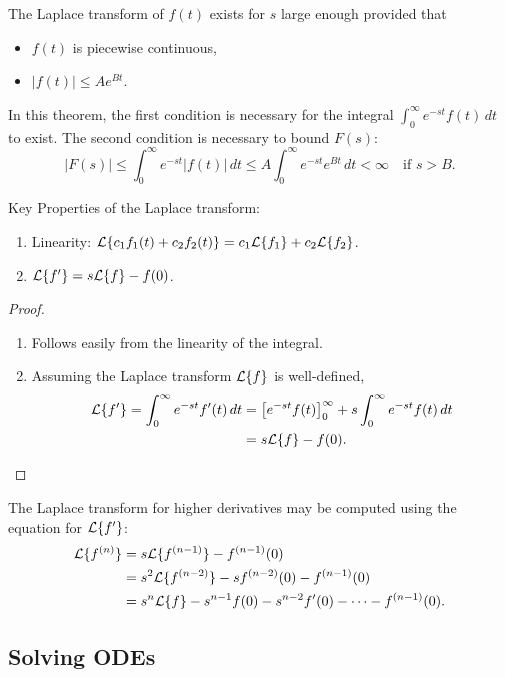 \begin{theorem}
	The Laplace transform of $f(t)$ exists for $s$ large enough provided that
	\begin{itemize}
		\item $f(t)$ is piecewise continuous,
		\item $|f(t)| \leq Ae^{Bt}$.
	\end{itemize}
\end{theorem}

In this theorem, the first condition is necessary for the integral $\int_0^{\infty} e^{-st}f(t)\,dt$ to exist. The second condition is necessary to bound $F(s)$:
\[
|F(s)| \leq \int_0^{\infty} e^{-st}|f(t)|\,dt \leq A\int_0^{\infty} e^{-st}e^{Bt}\,dt < \infty \quad\text{if } s>B.
\]

Key Properties of the Laplace transform:
\begin{enumerate}
	\item Linearity: $\mathcal{L}\{c_1f_1(t) + c_2f_2(t)\} = c_1\mathcal{L}\{f_1\} + c_2\mathcal{L}\{f_2\}$.
	\item $\mathcal{L}\{f'\} = s\mathcal{L}\{f\} - f(0)$.
\end{enumerate}

\begin{proof}\hfill
	\begin{enumerate}
		\item Follows easily from the linearity of the integral.
		\item Assuming the Laplace transform $\mathcal{L}\{f\}$ is well-defined,
		\begin{align*}
			\mathcal{L}\{f'\} = \int_0^{\infty} e^{-st}f'(t)\,dt &= \left[e^{-st}f(t)\right]_0^{\infty} + s\int_0^{\infty} e^{-st}f(t)\,dt \\
			&= s\mathcal{L}\{f\} - f(0).
		\end{align*}
	\end{enumerate}
\end{proof}

The Laplace transform for higher derivatives may be computed using the equation for $\mathcal{L}\{f'\}$:
\begin{align*}
	\mathcal{L}\{f^{(n)}\} &= s\mathcal{L}\{f^{(n-1)}\} - f^{(n-1)}(0) \\
	&= s^2\mathcal{L}\{f^{(n-2)}\} - sf^{(n-2)}(0) - f^{(n-1)}(0) \\
	&= s^n\mathcal{L}\{f\} - s^{n-1}f(0) - s^{n-2}f'(0) - \cdots - f^{(n-1)}(0).
\end{align*}

\subsection{Solving ODEs}

